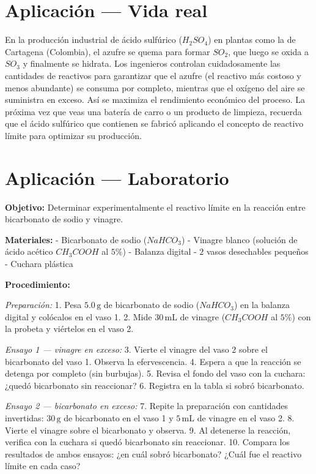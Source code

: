 \documentclass[
  spanish,
  letterpaper,
  12pt,
  oneside,
  open=any]{scrbook}
\newcommand{\setcolorsection}[2]{%
  \definecolor{currentsectionbg}{HTML}{#1}%
  \definecolor{currentsectionborder}{HTML}{#2}%
}
\begin{document}
\setcolorsection{c5e8d8}{a8d4c4}

\section{Aplicación --- Vida real}\label{aplicaciuxf3n-vida-real}

En la producción industrial de ácido sulfúrico (\(H_2SO_4\)) en plantas
como la de Cartagena (Colombia), el azufre se quema para formar
\(SO_2\), que luego se oxida a \(SO_3\) y finalmente se hidrata. Los
ingenieros controlan cuidadosamente las cantidades de reactivos para
garantizar que el azufre (el reactivo más costoso y menos abundante) se
consuma por completo, mientras que el oxígeno del aire se suministra en
exceso. Así se maximiza el rendimiento económico del proceso. La próxima
vez que veas una batería de carro o un producto de limpieza, recuerda
que el ácido sulfúrico que contienen se fabricó aplicando el concepto de
reactivo límite para optimizar su producción.

\setcolorsection{c5e8d8}{a8d4c4}

\section{Aplicación --- Laboratorio}\label{aplicaciuxf3n-laboratorio}

\textbf{Objetivo:} Determinar experimentalmente el reactivo límite en la
reacción entre bicarbonato de sodio y vinagre.

\textbf{Materiales:} - Bicarbonato de sodio (\(NaHCO_3\)) - Vinagre
blanco (solución de ácido acético \(CH_3COOH\) al \(5\%\)) - Balanza
digital - \(2\) vasos desechables pequeños - Cuchara plástica

\textbf{Procedimiento:}

\emph{Preparación:} 1. Pesa \(5.0\,\text{g}\) de bicarbonato de sodio
(\(NaHCO_3\)) en la balanza digital y colócalos en el vaso 1. 2. Mide
\(30\,\text{mL}\) de vinagre (\(CH_3COOH\) al \(5\%\)) con la probeta y
viértelos en el vaso 2.

\emph{Ensayo 1 --- vinagre en exceso:} 3. Vierte el vinagre del vaso 2
sobre el bicarbonato del vaso 1. Observa la efervescencia. 4. Espera a
que la reacción se detenga por completo (sin burbujas). 5. Revisa el
fondo del vaso con la cuchara: ¿quedó bicarbonato sin reaccionar? 6.
Registra en la tabla si sobró bicarbonato.

\emph{Ensayo 2 --- bicarbonato en exceso:} 7. Repite la preparación con
cantidades invertidas: \(30\,\text{g}\) de bicarbonato en el vaso 1 y
\(5\,\text{mL}\) de vinagre en el vaso 2. 8. Vierte el vinagre sobre el
bicarbonato y observa. 9. Al detenerse la reacción, verifica con la
cuchara si quedó bicarbonato sin reaccionar. 10. Compara los resultados
de ambos ensayos: ¿en cuál sobró bicarbonato? ¿Cuál fue el reactivo
límite en cada caso?
\end{document}

